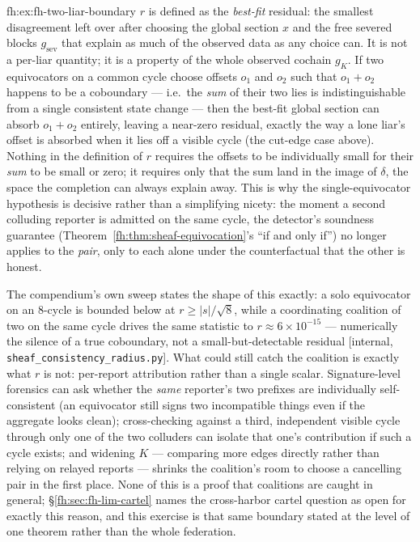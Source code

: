 \begin{pdSolution}{fh:ex:fh-two-liar-boundary}
$r$ is defined as the \emph{best-fit} residual: the smallest disagreement left over after choosing the global section $x$ and the free severed blocks $g_{\mathrm{sev}}$ that explain as much of the observed data as any choice can. It is not a per-liar quantity; it is a property of the whole observed cochain $g_K$. If two equivocators on a common cycle choose offsets $o_1$ and $o_2$ such that $o_1+o_2$ happens to be a coboundary --- i.e.\ the \emph{sum} of their two lies is indistinguishable from a single consistent state change --- then the best-fit global section can absorb $o_1+o_2$ entirely, leaving a near-zero residual, exactly the way a lone liar's offset is absorbed when it lies off a visible cycle (the cut-edge case above). Nothing in the definition of $r$ requires the offsets to be individually small for their \emph{sum} to be small or zero; it requires only that the sum land in the image of $\delta$, the space the completion can always explain away. This is why the single-equivocator hypothesis is decisive rather than a simplifying nicety: the moment a second colluding reporter is admitted on the same cycle, the detector's soundness guarantee (Theorem~\ref{fh:thm:sheaf-equivocation}'s ``if and only if'') no longer applies to the \emph{pair}, only to each alone under the counterfactual that the other is honest.

The compendium's own sweep states the shape of this exactly: a solo equivocator on an 8-cycle is bounded below at $r\ge|s|/\sqrt8$, while a coordinating coalition of two on the same cycle drives the same statistic to $r\approx6\times10^{-15}$ --- numerically the silence of a true coboundary, not a small-but-detectable residual [internal, \texttt{sheaf\_consistency\_radius.py}]. What could still catch the coalition is exactly what $r$ is not: per-report attribution rather than a single scalar. Signature-level forensics can ask whether the \emph{same} reporter's two prefixes are individually self-consistent (an equivocator still signs two incompatible things even if the aggregate looks clean); cross-checking against a third, independent visible cycle through only one of the two colluders can isolate that one's contribution if such a cycle exists; and widening $K$ --- comparing more edges directly rather than relying on relayed reports --- shrinks the coalition's room to choose a cancelling pair in the first place. None of this is a proof that coalitions are caught in general; \S\ref{fh:sec:fh-lim-cartel} names the cross-harbor cartel question as open for exactly this reason, and this exercise is that same boundary stated at the level of one theorem rather than the whole federation.
\end{pdSolution}
